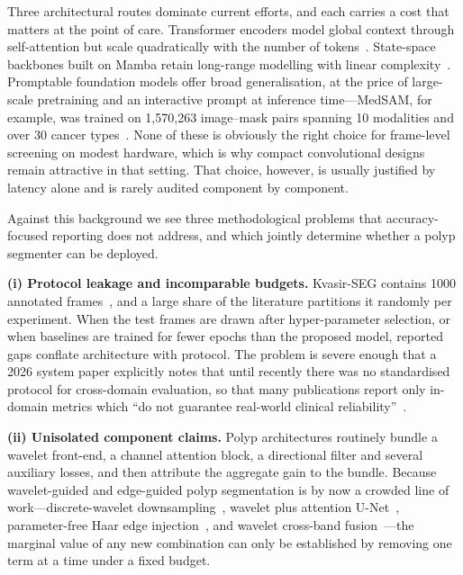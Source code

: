 \documentclass[journal]{IEEEtran}
\begin{document}
Three architectural routes dominate current efforts, and each carries a cost that matters at the point of care. Transformer encoders model global context through self-attention but scale quadratically with the number of tokens~\cite{chen2021transunet}. State-space backbones built on Mamba retain long-range modelling with linear complexity~\cite{ruan2024vmunet}. Promptable foundation models offer broad generalisation, at the price of large-scale pretraining and an interactive prompt at inference time---MedSAM, for example, was trained on 1{,}570{,}263 image--mask pairs spanning 10 modalities and over 30 cancer types~\cite{ma2024medsam}. None of these is obviously the right choice for frame-level screening on modest hardware, which is why compact convolutional designs remain attractive in that setting. That choice, however, is usually justified by latency alone and is rarely audited component by component.

Against this background we see three methodological problems that accuracy-focused reporting does not address, and which jointly determine whether a polyp segmenter can be deployed.

\textbf{(i) Protocol leakage and incomparable budgets.} Kvasir-SEG contains 1000 annotated frames~\cite{jha2020kvasir}, and a large share of the literature partitions it randomly per experiment. When the test frames are drawn after hyper-parameter selection, or when baselines are trained for fewer epochs than the proposed model, reported gaps conflate architecture with protocol. The problem is severe enough that a 2026 system paper explicitly notes that until recently there was no standardised protocol for cross-domain evaluation, so that many publications report only in-domain metrics which ``do not guarantee real-world clinical reliability''~\cite{xiao2026prysmnet}.

\textbf{(ii) Unisolated component claims.} Polyp architectures routinely bundle a wavelet front-end, a channel attention block, a directional filter and several auxiliary losses, and then attribute the aggregate gain to the bundle. Because wavelet-guided and edge-guided polyp segmentation is by now a crowded line of work---discrete-wavelet downsampling~\cite{zhao2023wranet}, wavelet plus attention U-Net~\cite{rajasekar2024adaptunet}, parameter-free Haar edge injection~\cite{yeemeganet2025}, and wavelet cross-band fusion~\cite{oh2026crossband}---the marginal value of any new combination can only be established by removing one term at a time under a fixed budget.
\end{document}
